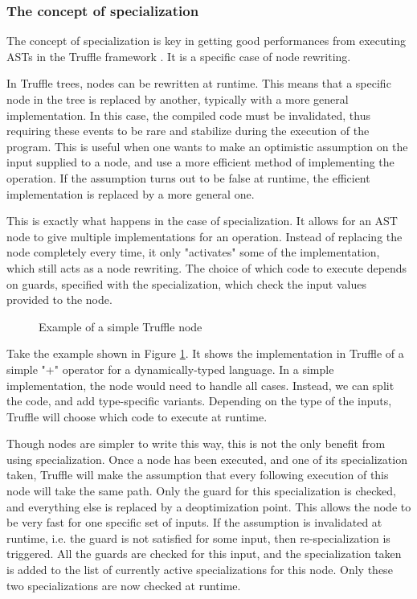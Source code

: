 \documentclass[twoside,11pt,a4paper]{article}
\begin{document}

\subsubsection{The concept of specialization}

The concept of specialization is key in getting good performances from executing ASTs in the Truffle framework \cite{trufflespec, truffledsl}. It is a specific case of node rewriting.

In Truffle trees, nodes can be rewritten at runtime. This means that a specific node in the tree is replaced by another, typically with a more general implementation. In this case, the compiled code must be invalidated, thus requiring these events to be rare and stabilize during the execution of the program. This is useful when one wants to make an optimistic assumption on the input supplied to a node, and use a more efficient method of implementing the operation. If the assumption turns out to be false at runtime, the efficient implementation is replaced by a more general one.

This is exactly what happens in the case of specialization. It allows for an AST node to give multiple implementations for an operation. Instead of replacing the node completely every time, it only "activates" some of the implementation, which still acts as a node rewriting. The choice of which code to execute depends on guards, specified with the specialization, which check the input values provided to the node.

\begin{figure}[t]
	
	\caption{Example of a simple Truffle node}
	\label{fig:truffleaddnode}
\end{figure}

Take the example shown in Figure \ref{fig:truffleaddnode}. It shows the implementation in Truffle of a simple "+" operator for a dynamically-typed language. In a simple implementation, the node would need to handle all cases. Instead, we can split the code, and add type-specific variants. Depending on the type of the inputs, Truffle will choose which code to execute at runtime.

Though nodes are simpler to write this way, this is not the only benefit from using specialization. Once a node has been executed, and one of its specialization taken, Truffle will make the assumption that every following execution of this node will take the same path. Only the guard for this specialization is checked, and everything else is replaced by a deoptimization point. This allows the node to be very fast for one specific set of inputs. If the assumption is invalidated at runtime, i.e. the guard is not satisfied for some input, then re-specialization is triggered. All the guards are checked for this input, and the specialization taken is added to the list of currently active specializations for this node. Only these two specializations are now checked at runtime.
\end{document}
